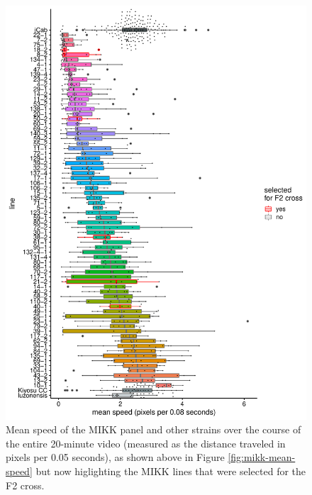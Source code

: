 \documentclass[
]{book}
\begin{document}
\begin{figure}
\includegraphics[width=1\linewidth]{figs/mikk_behaviour/line_mean_speed_0.05_selected} \caption{Mean speed of the MIKK panel and other strains over the course of the entire 20-minute video (measured as the distance traveled in pixels per 0.05 seconds), as shown above in Figure \ref{fig:mikk-mean-speed} but now higlighting the MIKK lines that were selected for the F2 cross.}\label{fig:F0-line-mean-speed-select}
\end{figure}
\end{document}
